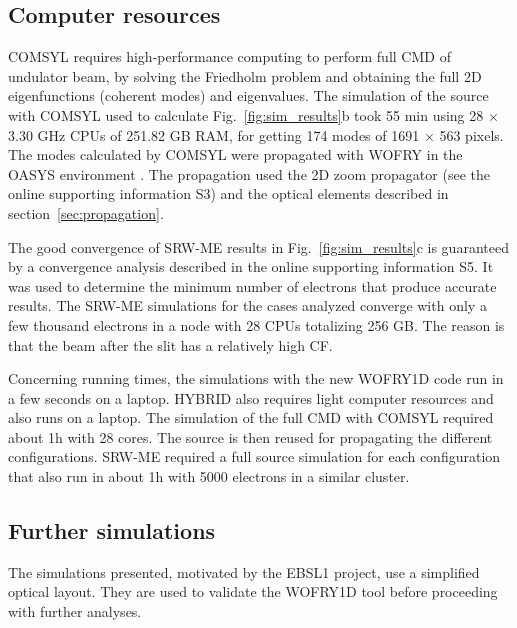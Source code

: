 \documentclass[preprint]{iucr}
\newcommand{\inred}[1]{{\color{red}#1}}
\begin{document}
\subsection{Computer resources}

COMSYL requires high\inred{-}performance computing to perform full CMD of undulator beam, by
solving the Friedholm problem and obtain\inred{ing} the full 2D eigenfunctions (coherent modes) and eigenvalues.
The simulation of the source with COMSYL used to calculate Fig.~\ref{fig:sim_results}b took 55 min using 28 $\times$ 3.30 GHz CPUs of 251.82 GB RAM, for getting 174 modes of 1691 $\times$ 563 pixels. The modes calculated by COMSYL were propagated with WOFRY in the OASYS environment \cite{codeOASYS}. The propagation used the 2D zoom propagator (\inred{see the online supporting information S3}) and the optical elements described in section~\ref{sec:propagation}. 

The good convergence of SRW-ME results in Fig.~\ref{fig:sim_results}c is guaranteed by a convergence analysis described in \inred{the online supporting information S5}. It was used to determine the minimum number of electrons that produce accurate results. The SRW-ME simulations for the cases analyzed converge with only a few thousand electrons
in a node with 28 CPUs totalizing 256 GB. The reason is that the beam after the slit has a relatively high CF. 

Concerning running times, the simulations with the new WOFRY1D code run in a few seconds \inred{on} a laptop.
HYBRID also requires light computer resources and also runs \inred{on} a laptop. 
The simulation of the full CMD with COMSYL required about 1h with 28 cores. The source is then reused for propagating the different configurations. SRW-ME required a full source simulation for each configuration that also run in about 1h with 5000 electrons in a similar cluster. 


\subsection{Further simulations}
\label{sec:discussion}

The simulations presented, motivated by the EBSL1 project, use a simplified optical layout. They are used to validate the WOFRY1D tool before proceeding with further analyses. 
\end{document}
